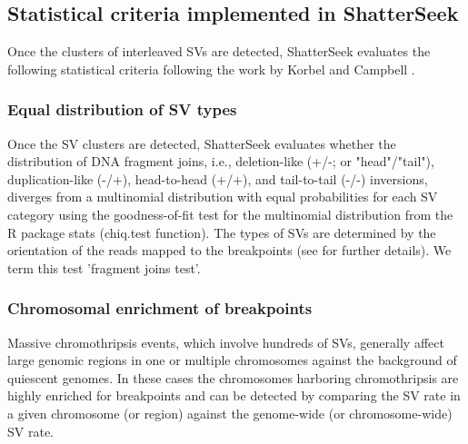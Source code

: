 \documentclass[twoside,a4wide,11pt]{article}\usepackage[]{graphicx}\usepackage[]{color}
\begin{document}
\subsection{Statistical criteria implemented in ShatterSeek}

Once the clusters of interleaved SVs are detected, ShatterSeek evaluates the following statistical criteria following the work by Korbel and Campbell \cite{Korbel2013}.


\subsubsection{Equal distribution of SV types}

Once the SV clusters are detected, ShatterSeek evaluates whether the distribution of DNA fragment joins,
i.e., deletion-like (+/-; or "head"/"tail"), duplication-like (-/+), head-to-head (+/+), and tail-to-tail (-/-) inversions,
diverges from a multinomial distribution with equal probabilities for each SV category using the goodness-of-fit test for the multinomial distribution from the R package stats (chiq.test function).
The types of SVs are determined by the orientation of the reads mapped to the breakpoints (see \cite{Zhang2013} for further details).
We term this test 'fragment joins test'.

\subsubsection{Chromosomal enrichment of breakpoints}
Massive chromothripsis events, which involve hundreds of SVs,
generally affect large genomic regions in one or multiple chromosomes against the background of 
quiescent genomes.
In these cases the chromosomes harboring chromothripsis are highly enriched for breakpoints
and can be detected by comparing the SV rate in a given chromosome (or region)
against the genome-wide (or chromosome-wide) SV rate.
\end{document}
